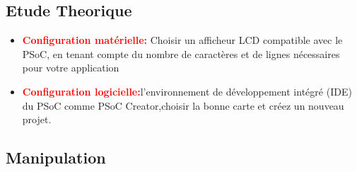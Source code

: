  \subsection{Etude Theorique}
 \label{sec:Etude Theorique}
 \begin{itemize}
     \item \textcolor{red}{\textbf{Configuration matérielle:}}
    Choisir un afficheur LCD compatible avec le PSoC, en tenant compte du nombre de caractères et de lignes
      nécessaires pour votre application
     \item \textcolor{red}{\textbf{Configuration logicielle:}}l'environnement de développement intégré (IDE) du PSoC
      comme PSoC Creator,choisir la bonne carte et créez un nouveau projet.
 \end{itemize}
 
 
 \subsection{Manipulation}
 \label{sec:Manipulation}
